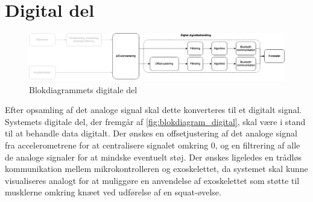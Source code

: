\section{Digital del} \label{sec:digital_del_krav}
\begin{figure}[H]
\centering
\includegraphics[width=1\textwidth]{figures/implementering/Blokdiagram_digital.png}
\caption{Blokdiagrammets digitale del}
\label{fig:blokdiagram_digital}
\end{figure}

\noindent
Efter opsamling af det analoge signal skal dette konverteres til et digitalt signal. Systemets digitale del, der fremgår af \autoref{fig:blokdiagram_digital}, skal være i stand til at behandle data digitalt. Der ønskes en offsetjustering af det analoge signal fra accelerometrene for at centralisere signalet omkring 0, og en filtrering af alle de analoge signaler for at mindske eventuelt støj. Der ønskes ligeledes en trådløs kommunikation mellem mikrokontrolleren og exoskelettet, da systemet skal kunne visualiseres analogt for at muliggøre en anvendelse af exoskelettet som støtte til musklerne omkring knæet ved udførelse af en squat-øvelse.


 


